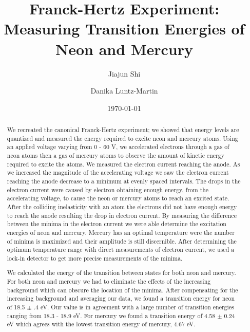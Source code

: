 \documentclass[prb,preprint]{revtex4-1}
\begin{document}
\title{Franck-Hertz Experiment: Measuring Transition Energies of Neon and Mercury}

\author{Jiajun Shi}


\author{Danika Luntz-Martin}


\date{\today}

\begin{abstract}

We recreated the canonical Franck-Hertz experiment; we showed that energy levels are quantized and measured the energy required to excite neon and mercury atoms. Using an applied voltage varying from 0 - 60 V, we accelerated electrons through a gas of neon atoms then a gas of mercury atoms to observe the amount of kinetic energy required to excite the atoms. We measured the electron current reaching the anode. As we increased the magnitude of the accelerating voltage we saw the electron current reaching the anode decrease to a minimum at evenly spaced intervals. The drops in the electron current were caused by electron obtaining enough energy, from the accelerating voltage, to cause the neon or mercury atoms to reach an excited state. After the colliding inelasticity with an atom the electrons did not have enough energy to reach the anode resulting the drop in electron current. By measuring the difference between the minima in the electron current we were able determine the excitation energies of neon and mercury. Mercury has an optimal temperature were the number of minima is maximized and their amplitude is still discernible. After determining the optimum temperature range with direct measurements of electron current, we used a lock-in detector to get more precise measurements of the minima. 

We calculated the energy of the transition between states for both neon and mercury. For both neon and mercury we had to eliminate the effects of the increasing background which can obscure the location of the minima. After compensating for the increasing background and averaging our data, we found a transition energy for neon of 18.5 $\pm$ .4 eV. Our value is in agreement with a large number of transition energies ranging from 18.3 - 18.9 eV. For mercury we found a transition energy of 4.58 $\pm$ 0.24 eV which agrees with the lowest transition energy of mercury, 4.67 eV.

\end{abstract}
\end{document}
